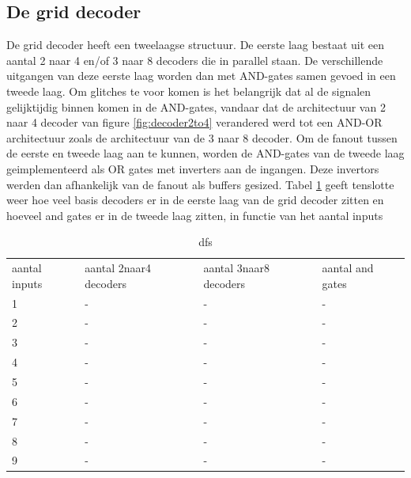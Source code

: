 \subsection{De grid decoder}
De grid decoder heeft een tweelaagse structuur. De eerste laag bestaat uit een aantal 2 naar 4 en/of 3 naar 8 decoders die in parallel staan. De verschillende uitgangen van deze eerste laag worden dan met AND-gates samen gevoed in een tweede laag. Om glitches te voor komen is het belangrijk dat al de signalen gelijktijdig binnen komen in de AND-gates, vandaar dat de architectuur van 2 naar 4 decoder van figure \ref{fig:decoder2to4} verandered werd tot een AND-OR architectuur zoals de architectuur van de 3 naar 8 decoder. Om de fanout tussen de eerste en tweede laag aan te kunnen, worden de AND-gates van de tweede laag geimplementeerd als OR gates met inverters aan de ingangen. Deze invertors werden dan afhankelijk van de fanout als buffers gesized. Tabel \ref{tab:griddecoder} geeft tenslotte weer hoe veel basis decoders er in de eerste laag van de grid decoder zitten en hoeveel and gates er in de tweede laag zitten, in functie van het aantal inputs

\begin{table}
\begin{center}
\begin{tabular}{llll}
aantal inputs & aantal 2naar4 decoders & aantal 3naar8 decoders & aantal and gates\\
1 & - & - & -\\
2 & - & - & -\\
3 & - & - & -\\
4 & - & - & -\\
5 & - & - & -\\
6 & - & - & -\\
7 & - & - & -\\
8 & - & - & -\\
9 & - & - & -
\end{tabular}
\end{center}
\caption{dfs}
\label{tab:griddecoder}
\end{table}


